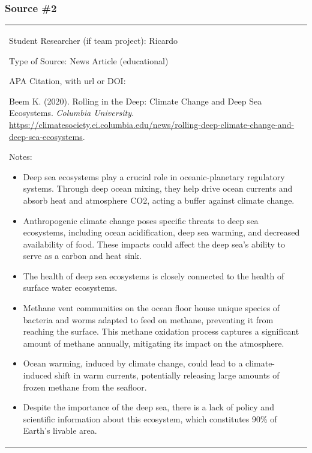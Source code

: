 \subsubsection{\texorpdfstring{\hfill\break
}{ }}\label{section-1}

\subsubsection{\texorpdfstring{\textbf{Source
\#2}}{Source \#2}}\label{source-2}

\begin{longtable}[]{@{}
  >{\raggedright\arraybackslash}p{}@{}}
\toprule\noalign{}

Student Researcher (if team project): Ricardo


Type of Source: News Article (educational)


APA Citation, with url or DOI:

Beem K. (2020). Rolling in the Deep: Climate Change and Deep Sea
Ecosystems. \emph{Columbia University.}
\href{https://climatesociety.ei.columbia.edu/news/rolling-deep-climate-change-and-deep-sea-ecosystems}{https://climatesociety.ei.columbia.edu/news/rolling-deep-climate-change-and-deep-sea-ecosystems}.


Notes:

\begin{itemize}
\item
  Deep sea ecosystems play a crucial role in oceanic-planetary
  regulatory systems. Through deep ocean mixing, they help drive ocean
  currents and absorb heat and atmosphere CO2, acting a buffer against
  climate change.
\item
  Anthropogenic climate change poses specific threats to deep sea
  ecosystems, including ocean acidification, deep sea warming, and
  decreased availability of food. These impacts could affect the deep
  sea's ability to serve as a carbon and heat sink.
\item
  The health of deep sea ecosystems is closely connected to the health
  of surface water ecosystems.
\item
  Methane vent communities on the ocean floor house unique species of
  bacteria and worms adapted to feed on methane, preventing it from
  reaching the surface. This methane oxidation process captures a
  significant amount of methane annually, mitigating its impact on the
  atmosphere.
\item
  Ocean warming, induced by climate change, could lead to a
  climate-induced shift in warm currents, potentially releasing large
  amounts of frozen methane from the seafloor.
\item
  Despite the importance of the deep sea, there is a lack of policy and
  scientific information about this ecosystem, which constitutes 90\% of
  Earth's livable area.
\end{itemize}



\end{longtable}
